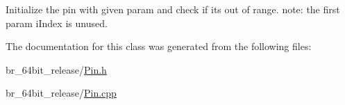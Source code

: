 Initialize the pin with given param and check if it\textquotesingle{}s out of range. note\+: the first param i\+Index is unused. 

The documentation for this class was generated from the following files\+:\begin{DoxyCompactItemize}
\item 
br\+\_\+64bit\+\_\+release/\mbox{\hyperlink{Pin_8h}{Pin.\+h}}\item 
br\+\_\+64bit\+\_\+release/\mbox{\hyperlink{Pin_8cpp}{Pin.\+cpp}}\end{DoxyCompactItemize}
